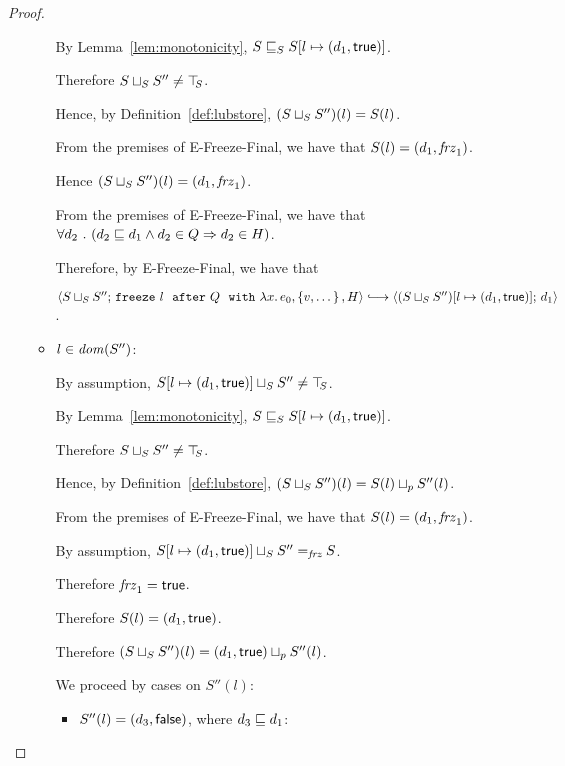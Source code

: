 \begin{proof}
\begin{itemize}
\begin{itemize}
        By Lemma~\ref{lem:monotonicity},
        $S \sqsubseteq_S S[l \mapsto (d_1, \textsf{true})]$.

        Therefore $S \sqcup_{S} S'' \neq \top\hspace{-0.85mm}_{S}$.

        Hence, by Definition~\ref{def:lubstore},
        $(S \sqcup_{S} S'')(l) = S(l)$.

        From the premises of {\sc E-Freeze-Final}, we have that $S(l)
        = (d_1, \mathit{frz}_1)$.

        Hence $(S \sqcup_{S} S'')(l) = (d_1, \mathit{frz}_1)$.

        From the premises of {\sc E-Freeze-Final}, we have that
        $\forall{d_2} ~.~ ( {d_2 \sqsubseteq d_1 \land d_2 \in Q} \Rightarrow d_2 \in
        H)$.

        Therefore, by {\sc E-Freeze-Final}, we have that

        $\config{\lubstore{S}{S''}}{\freezeafterfull{l}{Q}{\lam{x}{e_0}}{\setof{v,
              \dots}}{H}} \parstepsto
        \config{\extS{(\lubstore{S}{S''})}{l}{d_1}{\frozentrue}}{d_1}$.


      \item $l \in \mathit{dom}(S'')$:

        By assumption, $S[l \mapsto (d_1, \textsf{true})] \sqcup_{S} S''
        \neq \top\hspace{-0.85mm}_{S}$.

        By Lemma~\ref{lem:monotonicity},
        $S \sqsubseteq_S S[l \mapsto (d_1, \textsf{true})]$.

        Therefore $S \sqcup_{S} S'' \neq \top\hspace{-0.85mm}_{S}$.

        Hence, by Definition~\ref{def:lubstore},
        $(S \sqcup_{S} S'')(l) = S(l) \sqcup_p S''(l)$.

        From the premises of {\sc E-Freeze-Final}, we have that
        $S(l) = (d_1, \mathit{frz}_1)$.

        By assumption, $S[l \mapsto (d_1, \textsf{true})] \sqcup_{S} S''
        =_{\textit{frz}} S$.

        Therefore $\mathit{frz}_1 = \textsf{true}$.

        Therefore $S(l) = (d_1, \textsf{true})$.

        Therefore $(S \sqcup_{S} S'')(l) =
        (d_1, \textsf{true}) \sqcup_p S''(l)$.

        We proceed by cases on $S''(l)$:
        \begin{itemize}
        \item $S''(l) = (d_3, \textsf{false})$, where $d_3 \sqsubseteq d_1$:


\end{itemize}
\end{itemize}
\end{itemize}
\end{proof}
